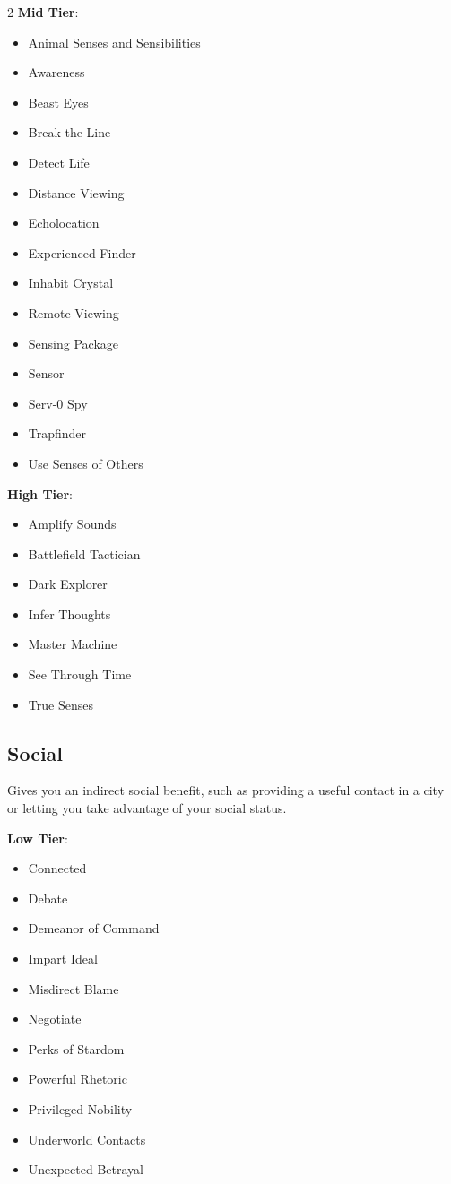 \begin{multicols}{2}
\textbf{Mid Tier}: 

\begin{itemize}
\item Animal Senses and Sensibilities
\item Awareness
\item Beast Eyes
\item Break the Line
\item Detect Life
\item Distance Viewing
\item Echolocation
\item Experienced Finder
\item Inhabit Crystal
\item Remote Viewing
\item Sensing Package
\item Sensor
\item Serv-0 Spy
\item Trapfinder
\item Use Senses of Others
\end{itemize}

\textbf{High Tier}:

\begin{itemize}
\item Amplify Sounds
\item Battlefield Tactician
\item Dark Explorer
\item Infer Thoughts
\item Master Machine
\item See Through Time
\item True Senses
\end{itemize}

\subsection{Social}

Gives you an indirect social benefit, such as providing a useful contact in a city or letting you take advantage of your social status.

\textbf{Low Tier}:

\begin{itemize}
\item Connected
\item Debate
\item Demeanor of Command
\item Impart Ideal
\item Misdirect Blame
\item Negotiate
\item Perks of Stardom
\item Powerful Rhetoric
\item Privileged Nobility
\item Underworld Contacts
\item Unexpected Betrayal
\end{itemize}


\end{multicols}
